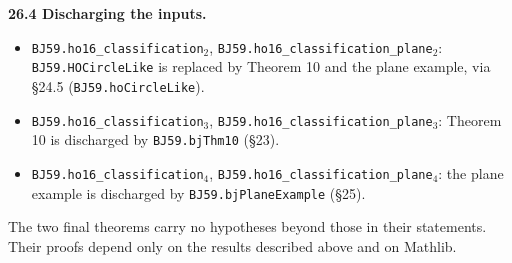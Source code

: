 \documentclass[11pt]{article}
\newcommand{\lean}[1]{\texttt{#1}}
\begin{document}
\textbf{26.4 Discharging the inputs.}

\begin{itemize}
  \item \lean{BJ59.\hspace{0pt}ho16\_\hspace{0pt}classification$_{2}$}, \lean{BJ59.\hspace{0pt}ho16\_\hspace{0pt}classification\_\hspace{0pt}plane$_{2}$}: \lean{BJ59.\hspace{0pt}HOCircleLike} is replaced by Theorem 10 and the plane example, via \S{}24.5 (\lean{BJ59.\hspace{0pt}hoCircleLike}).
  \item \lean{BJ59.\hspace{0pt}ho16\_\hspace{0pt}classification$_{3}$}, \lean{BJ59.\hspace{0pt}ho16\_\hspace{0pt}classification\_\hspace{0pt}plane$_{3}$}: Theorem 10 is discharged by \lean{BJ59.\hspace{0pt}bjThm10} (\S{}23).
  \item \lean{BJ59.\hspace{0pt}ho16\_\hspace{0pt}classification$_{4}$}, \lean{BJ59.\hspace{0pt}ho16\_\hspace{0pt}classification\_\hspace{0pt}plane$_{4}$}: the plane example is discharged by \lean{BJ59.\hspace{0pt}bjPlaneExample} (\S{}25).
\end{itemize}

The two final theorems carry no hypotheses beyond those in their statements. Their proofs depend only on the results described above and on Mathlib.
\end{document}
